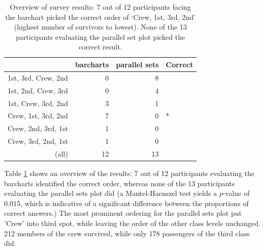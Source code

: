 \begin{table}[ht]
\begin{center}
\begin{tabular}{rrrl}
  \hline
 & barcharts & parallel sets & Correct \\ 
  \hline
 1st, 3rd, Crew,  2nd & 0 & 8 &  \\ 
  1st, 2nd, Crew, 3rd & 0 & 4 &  \\ 
 1st, Crew, 3rd, 2nd & 3 & 1 &  \\ 
  Crew, 1st, 3rd, 2nd & 7 & 0 & * \\ 
  Crew, 2nd, 3rd, 1st & 1 & 0 &  \\ 
  Crew, 3rd, 2nd, 1st & 1 & 0 &  \\ 
   \hline
(all) & 12 & 13 &  \\ 
   \hline
\end{tabular}
\caption{Overview of survey results: 7 out of 12 participants facing the barchart picked the correct order of `Crew, 1st, 3rd, 2nd' (highest number of survivors to lowest). None of the 13 participants evaluating the parallel set plot picked the correct result. }
\label{tab:results}
\end{center}
\end{table}


%
%
%


Table \ref{tab:results} shows an overview of the results: 7 out of 12 participants evaluating the barcharts identified the correct order, whereas none of the 13 participants evaluating the parallel sets plot did (a Mantel-Haenszel test yields a $p$-value of 0.015, which is indicative of a significant difference between the proportions of correct answers.) The most prominent ordering for the parallel sets plot 
put 'Crew' into third spot, while leaving the order of the other class levels unchanged. 212 members of the crew survived, while only 178 passengers of the third class did. 

